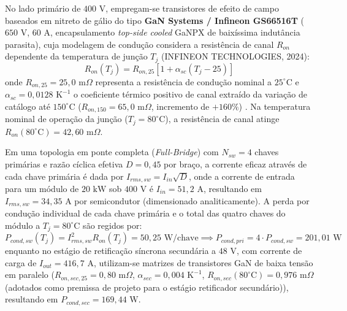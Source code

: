 No lado primário de $400\text{ V}$, empregam-se transistores de efeito de campo baseados em nitreto de gálio do tipo \textbf{GaN Systems / Infineon GS66516T} ($650\text{ V}$, $60\text{ A}$, encapsulamento \textit{top-side cooled} GaNPX de baixíssima indutância parasita), cuja modelagem de condução considera a resistência de canal $R_{on}$ dependente da temperatura de junção $T_j$ (INFINEON TECHNOLOGIES, 2024):
\begin{equation}
    R_{on}(T_j) = R_{on,25} \left[ 1 + \alpha_{sc} (T_j - 25) \right]
    \label{eq:ron_gan}
\end{equation}
onde $R_{on,25} = 25{,}0\text{ m}\Omega$ representa a resistência de condução nominal a $25^\circ\text{C}$ e $\alpha_{sc} = 0{,}0128\text{ K}^{-1}$ o coeficiente térmico positivo de canal extraído da variação de catálogo até $150^\circ\text{C}$ ($R_{on,150} = 65{,}0\text{ m}\Omega$, incremento de $+160\%$) . Na temperatura nominal de operação da junção ($T_j = 80^\circ\text{C}$), a resistência de canal atinge $R_{on}(80^\circ\text{C}) = 42{,}60\text{ m}\Omega$.

Em uma topologia em ponte completa (\textit{Full-Bridge}) com $N_{sw} = 4$ chaves primárias e razão cíclica efetiva $D = 0{,}45$ por braço, a corrente eficaz através de cada chave primária é dada por $I_{rms,sw} = I_{in} \sqrt{D}$, onde a corrente de entrada para um módulo de $20\text{ kW}$ sob $400\text{ V}$ é $I_{in} = 51{,}2\text{ A}$, resultando em $I_{rms,sw} = 34{,}35\text{ A}$ por semicondutor (dimensionado analiticamente). A perda por condução individual de cada chave primária e o total das quatro chaves do módulo a $T_j = 80^\circ\text{C}$ são regidos por:
\begin{equation}
    P_{cond,sw}(T_j) = I_{rms,sw}^2 R_{on}(T_j) = 50{,}25\text{ W/chave} \implies P_{cond,pri} = 4 \cdot P_{cond,sw} = 201{,}01\text{ W}
    \label{eq:pcond_sw}
\end{equation}
enquanto no estágio de retificação síncrona secundária a $48\text{ V}$, com corrente de carga de $I_{out} = 416{,}7\text{ A}$, utilizam-se matrizes de transistores GaN de baixa tensão em paralelo ($R_{on,sec,25} = 0{,}80\text{ m}\Omega$, $\alpha_{sec} = 0{,}004\text{ K}^{-1}$, $R_{on,sec}(80^\circ\text{C}) = 0{,}976\text{ m}\Omega$ (adotados como premissa de projeto para o estágio retificador secundário)), resultando em $P_{cond,sec} = 169{,}44\text{ W}$.

